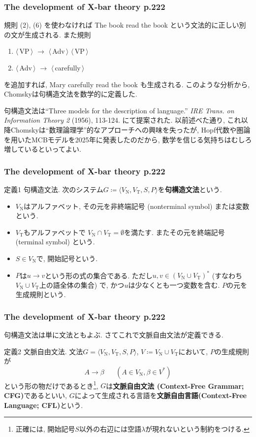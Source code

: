 \documentclass[dvipdfmx, xcolor={dvipsnames},12pt]{beamer}
\begin{document}
\begin{frame}
\frametitle{The development of X-bar theory p.222}
規則 (2), (6) を使わなければ The book read the book という文法的に正しい別の文が生成される. また規則
\vspace{0.5em}
\begin{enumerate}
\item[(9)] $\langle$\,VP\,$\rangle$ $\to$ $\langle$\,Adv\,$\rangle$ $\langle$\,VP\,$\rangle$
\item[(10)] $\langle$\,Adv\,$\rangle$ $\to$ $\langle$\,carefully\,$\rangle$
\end{enumerate}
\vspace{0.5em}
を追加すれば, Mary carefully read the book も生成される. このような分析から, Chomskyは句構造文法を数学的に定義した.
\begin{marker}
句構造文法は``Three models for the description of language.'' \textit{IRE Trans. on Information Theory 2} (1956), 113-124. にて提案された. 以前述べた通り, これ以降Chomskyは``数理論理学''的なアプローチへの興味を失ったが, Hopf代数や圏論を用いたMCBモデルを2025年に発表したのだから, 数学を信じる気持ちはむしろ増しているといってよい.
\end{marker}
\end{frame}

\begin{frame}
\frametitle{The development of X-bar theory p.222}
\begin{Def}{定義1 句構造文法.}
次のシステム$G\coloneq\langle V_\text{N}, V_\text{T}, S, P\rangle$を\textbf{句構造文法}という.
\begin{itemize}
\item $V_\text{N}$はアルファベット, その元を非終端記号 (nonterminal symbol) または変数という.
\item $V_\text{T}$もアルファベットで $V_\text{N}\cap V_\text{T}=\emptyset$を満たす. またその元を終端記号 (terminal symbol) という.
\item $S\in V_\text{N}$で, 開始記号という.
\item $P$は$u\to v$という形の式の集合である. ただし$u,v\in (V_\text{N}\cup V_\text{T})^*$ (すなわち$V_\text{N}\cup V_\text{T}$上の語全体の集合) で, かつ$u$は少なくとも一つ変数を含む. $P$の元を生成規則という.
\end{itemize}
\end{Def}
\end{frame}

\begin{frame}
\frametitle{The development of X-bar theory p.222}
句構造文法は単に文法ともよぶ. さてこれで文脈自由文法が定義できる.

\begin{Def}{定義2 文脈自由文法.}
文法$G=\langle V_\text{N}, V_\text{T}, S, P\rangle$, $V\coloneq V_\text{N}\cup V_\text{T}$において, $P$の生成規則が
\[
A\to \beta \hspace{20pt}(A\in V_\text{N}, \beta\in V^*)
\]
という形の物だけであるとき\footnote{正確には, 開始記号$S$以外の右辺には空語$\lambda$が現れないという制約をつける.}, $G$は\textbf{文脈自由文法 (Context-Free Grammar; CFG)}であるといい, $G$によって生成される言語を\textbf{文脈自由言語(Context-Free Language; CFL)}という.
\end{Def}
\end{frame}
\end{document}
